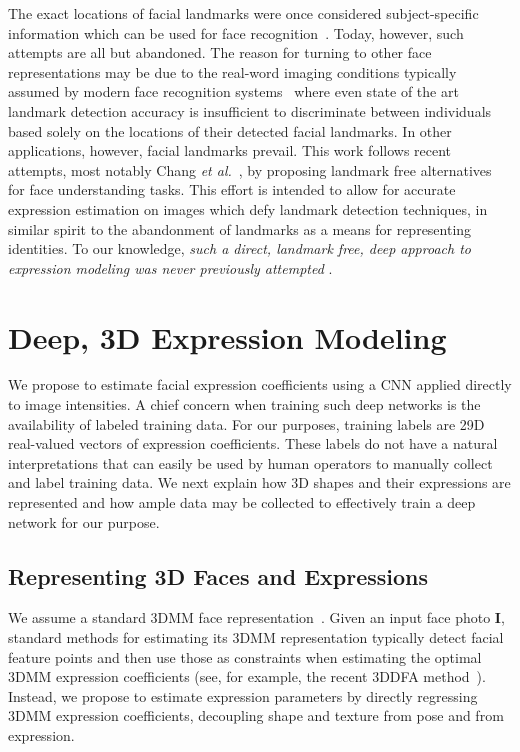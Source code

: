 \documentclass[a4paper, 10pt, conference]{ieeeconf}
\def\mbf#1{\mathbf{#1}}
\begin{document}
The exact locations of facial landmarks were once considered subject-specific information which can be used for face recognition~\cite{edwards1998face}. Today, however, such attempts are all but abandoned. The reason for turning to other face representations may be due to the real-word imaging conditions typically assumed by modern face recognition systems~\cite{Klare_2015_CVPR} where even state of the art landmark detection accuracy is insufficient to discriminate between individuals based solely on the locations of their detected facial landmarks. In other applications, however, facial landmarks prevail. This work follows recent attempts, most notably Chang {\em et al.}~\cite{chang17fpn}, by proposing landmark free alternatives for face understanding tasks. This effort is intended to allow for accurate expression estimation on images which defy landmark detection techniques, in similar spirit to the abandonment of landmarks as a means for representing identities. To our knowledge, {\em such a direct, landmark free, deep approach to expression modeling was never previously attempted} . 


\section{Deep, 3D Expression Modeling}\label{sec:deepexpr}
We propose to estimate facial expression coefficients using a CNN applied directly to image intensities. A chief concern when training such deep networks is the availability of labeled training data. For our purposes, training labels are 29D real-valued vectors of expression coefficients. These labels do not have a natural interpretations that can easily be used by human operators to manually collect and label training data. We next explain how 3D shapes and their expressions are represented and how ample data may be collected to effectively train a deep network for our purpose.


\subsection{Representing 3D Faces and Expressions}\label{sec:background}
We assume a standard 3DMM face representation~\cite{blanz2002face,blanz2003face,chu2014,hu2016face,paysan09basel}. Given an input face photo $\mbf{I}$, standard methods for estimating its 3DMM representation typically detect facial feature points and then use those as constraints when estimating the optimal 3DMM expression coefficients (see, for example, the recent 3DDFA method~\cite{zhu2015}). Instead, we propose to estimate expression parameters by directly regressing 3DMM expression coefficients, decoupling shape and texture from pose and from expression.
\end{document}
